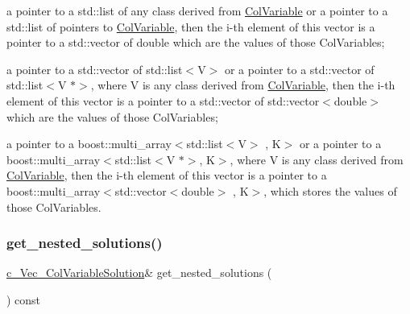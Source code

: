\begin{DoxyItemize}
\item a pointer to a std\+::list of any class derived from \mbox{\hyperlink{class_s_m_spp__di__unipi__it_1_1_col_variable}{Col\+Variable}} or a pointer to a std\+::list of pointers to \mbox{\hyperlink{class_s_m_spp__di__unipi__it_1_1_col_variable}{Col\+Variable}}, then the i-\/th element of this vector is a pointer to a std\+::vector of double which are the values of those Col\+Variables;
\item a pointer to a std\+::vector of std\+::list$<$\+V$>$ or a pointer to a std\+::vector of std\+::list$<$\+V $\ast$$>$, where V is any class derived from \mbox{\hyperlink{class_s_m_spp__di__unipi__it_1_1_col_variable}{Col\+Variable}}, then the i-\/th element of this vector is a pointer to a std\+::vector of std\+::vector$<$double$>$ which are the values of those Col\+Variables;
\item a pointer to a boost\+::multi\+\_\+array$<$std\+::list$<$\+V$>$ , K$>$ or a pointer to a boost\+::multi\+\_\+array$<$std\+::list$<$\+V $\ast$$>$, K$>$, where V is any class derived from \mbox{\hyperlink{class_s_m_spp__di__unipi__it_1_1_col_variable}{Col\+Variable}}, then the i-\/th element of this vector is a pointer to a boost\+::multi\+\_\+array$<$std\+::vector$<$double$>$ , K$>$, which stores the values of those Col\+Variables. 
\end{DoxyItemize}\mbox{\label{class_s_m_spp__di__unipi__it_1_1_col_variable_solution_ab3ad6d01d365ff2ad0997dc774a1fe64}} 
\subsubsection{\texorpdfstring{get\+\_\+nested\+\_\+solutions()}{get\_nested\_solutions()}}
{\footnotesize\ttfamily \mbox{\hyperlink{group___col_variable_solution___t_y_p_e_s_gac9f0485d8cd9fac29d0b83dbc3242c0e}{c\+\_\+\+Vec\+\_\+\+Col\+Variable\+Solution}}\& get\+\_\+nested\+\_\+solutions (\begin{DoxyParamCaption}\item[{void}]{ }\end{DoxyParamCaption}) const\hspace{0.3cm}{\ttfamily [inline]}}



